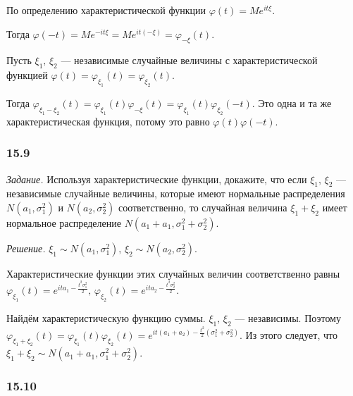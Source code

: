 По определению характеристической функции $ \varphi \left( t \right) = Me^{it \xi }$.

Тогда
$ \varphi \left( - t \right) =
  Me^{- it \xi } =
  Me^{it \left( - \xi \right) } =
  \varphi_{- \xi } \left( t \right) $.

Пусть $ \xi_1, \, \xi_2$ ---
независимые случайные величины с характеристической функцией
$ \varphi \left( t \right) =
  \varphi_{ \xi_1} \left( t \right) =
  \varphi_{ \xi_2} \left( t \right) $.

Тогда
$ \varphi_{ \xi_1 - \xi_2} \left( t \right) =
  \varphi_{ \xi_1} \left( t \right) \varphi_{- \xi} \left( t \right) =
  \varphi_{ \xi_1} \left( t \right) \varphi_{ \xi_2} \left( - t \right) $.
Это одна и та же характеристическая функция,
потому это равно $ \varphi \left( t \right) \varphi \left( - t \right) $.

\subsubsection*{15.9}

\textit{Задание.}
Используя характеристические функции, докажите, что если $ \xi_1, \, \xi_2$ ---
независимые случайные величины,
которые имеют нормальные распределения
$N \left( a_1, \sigma_1^2 \right) $ и $N \left( a_2, \sigma_2^2 \right) $ соответственно,
то случайная величина $ \xi_1 + \xi_2$ имеет нормальное распределение
$N \left( a_1 + a_1, \sigma_1^2 + \sigma_2^2 \right) $.

\textit{Решение.}
$ \xi_1 \sim N \left( a_1, \sigma_1^2 \right), \,
  \xi_2 \sim N \left( a_2, \sigma_2^2 \right) $.

Характеристические функции этих случайных величин соответственно равны
$ \varphi_{ \xi_1} \left( t \right) = e^{ita_1 - \frac{t^2 \sigma_1^2}{2}}, \,
\varphi_{ \xi_2} \left( t \right) = e^{ita_2 - \frac{t^2 \sigma_2^2}{2}}$.

Найдём характеристическую функцию суммы.
$ \xi_1, \, \xi_2$ --- независимы.
Поэтому
$ \varphi_{ \xi_1 + \xi_2} \left( t \right) =
\varphi_{ \xi_1} \left( t \right) \varphi_{ \xi_2} \left( t \right) =
e^{it \left( a_1 + a_2 \right) - \frac{t^2}{2} \left( \sigma_1^2 + \sigma_2^2 \right) }$.
Из этого следует, что $ \xi_1 + \xi_2 \sim N \left( a_1 + a_1, \sigma_1^2 + \sigma_2^2 \right) $.

\subsubsection*{15.10}

